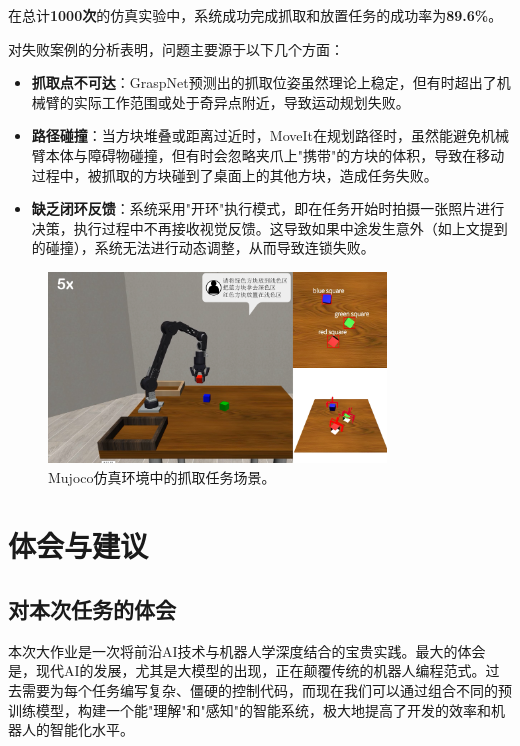\documentclass{article}
\begin{document}
\begin{CJK*}{UTF8}{gbsn}
在总计\textbf{1000次}的仿真实验中，系统成功完成抓取和放置任务的成功率为\textbf{89.6\%}。

对失败案例的分析表明，问题主要源于以下几个方面：
\begin{itemize}
    \item   \textbf{抓取点不可达}：GraspNet预测出的抓取位姿虽然理论上稳定，但有时超出了机械臂的实际工作范围或处于奇异点附近，导致运动规划失败。
    \item   \textbf{路径碰撞}：当方块堆叠或距离过近时，MoveIt在规划路径时，虽然能避免机械臂本体与障碍物碰撞，但有时会忽略夹爪上"携带"的方块的体积，导致在移动过程中，被抓取的方块碰到了桌面上的其他方块，造成任务失败。
    \item   \textbf{缺乏闭环反馈}：系统采用"开环"执行模式，即在任务开始时拍摄一张照片进行决策，执行过程中不再接收视觉反馈。这导致如果中途发生意外（如上文提到的碰撞），系统无法进行动态调整，从而导致连锁失败。
\end{itemize}

\begin{figure}[h!]
    \centering
    \includegraphics[width=0.8\textwidth]{image/report/1749437618596.png}
    \caption{Mujoco仿真环境中的抓取任务场景。}
    \label{fig:sim}
\end{figure}

\section{体会与建议}

\subsection{对本次任务的体会}

本次大作业是一次将前沿AI技术与机器人学深度结合的宝贵实践。最大的体会是，现代AI的发展，尤其是大模型的出现，正在颠覆传统的机器人编程范式。过去需要为每个任务编写复杂、僵硬的控制代码，而现在我们可以通过组合不同的预训练模型，构建一个能"理解"和"感知"的智能系统，极大地提高了开发的效率和机器人的智能化水平。


\end{CJK*}
\end{document}
